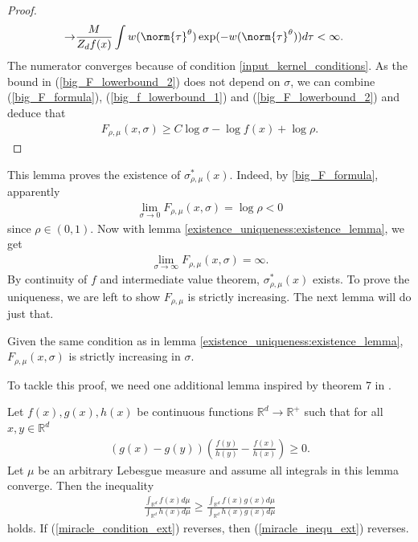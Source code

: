 \begin{proof}
\begin{align}
        \to  & \frac{M}{Z_d f(x)} \int w(\norm{\tau}^{\theta})\exp(-w(\norm{\tau}^{\theta}))d\tau < \infty.
    \end{align}
    The numerator converges because of condition \ref{input_kernel_conditions}. As the bound in (\ref{big_F_lowerbound_2}) does not depend on $\sigma$, we can combine (\ref{big_F_formula}), (\ref{big_f_lowerbound_1}) and (\ref{big_F_lowerbound_2}) and deduce that
    \begin{align}
        F_{\rho,\mu}(x,\sigma) \geq C \log \sigma - \log f(x) + \log \rho.
    \end{align}
\end{proof}
This lemma proves the existence of $\sigma^*_{\rho,\mu}(x)$. Indeed, by \eqref{big_F_formula}, apparently
\begin{align} \label{existence_uniqueness:limit_1}
    \lim_{\sigma \to 0} F_{\rho,\mu}(x,\sigma) = \log \rho < 0
\end{align}
since $\rho \in (0,1)$. Now with lemma \ref{existence_uniqueness:existence_lemma}, we get
\begin{align} \label{existence_uniqueness:limit_2}
    \lim_{\sigma \to \infty} F_{\rho,\mu}(x,\sigma) = \infty.
\end{align}
By continuity of $f$ and intermediate value theorem, $\sigma^*_{\rho,\mu}(x)$ exists. To prove the uniqueness, we are left to show $F_{\rho,\mu}$ is strictly increasing. The next lemma will do just that.
\begin{lemma} \label{existence_uniqueness:uniqueness_lemma}
    Given the same condition as in lemma \ref{existence_uniqueness:existence_lemma}, $F_{\rho,\mu}(x,\sigma)$ is strictly increasing in $\sigma$.
\end{lemma}
To tackle this proof, we need one additional lemma inspired by theorem 7 in \cite{liu2000inequ}.
\begin{lemma} \label{miracle_lemma_ext}
    Let $f(x),g(x),h(x)$ be continuous functions $\mathbb{R}^d \to \mathbb{R}^+$ such that for all $x,y \in \mathbb{R}^d$
    \begin{align} \label{miracle_condition_ext}
        \left(g(x)-g(y)\right)\left(\frac{f(y)}{h(y)}-\frac{f(x)}{h(x)}\right) \geq 0.
    \end{align}
    Let $\mu$ be an arbitrary Lebesgue measure and assume all integrals in this lemma converge. Then the inequality
    \begin{align} \label{miracle_inequ_ext}
        \frac{\int_{\mathbb{R}^d} f(x)d\mu}{\int_{\mathbb{R}^d} h(x)d\mu} \geq \frac{\int_{\mathbb{R}^d} f(x)g(x)d\mu}{\int_{\mathbb{R}^d} h(x)g(x)d\mu}
    \end{align}
    holds. If (\ref{miracle_condition_ext}) reverses, then (\ref{miracle_inequ_ext}) reverses.
\end{lemma}
